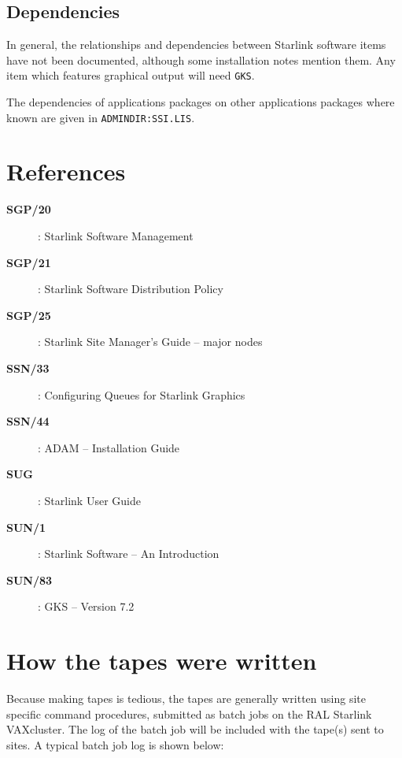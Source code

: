 \subsection {Dependencies}

In general, the relationships and dependencies between Starlink software items
have not been documented, although some installation notes mention them.
Any item which features graphical output will need {\tt GKS}.

The dependencies of applications packages on other applications packages where
known are given in {\tt ADMINDIR\-:SSI.LIS}.

\section {References}
\label{se:references}

\begin{description}
\begin{description}
\item[\bf SGP/20]: Starlink Software Management
\item[\bf SGP/21]: Starlink Software Distribution Policy
\item[\bf SGP/25]: Starlink Site Manager's Guide -- major nodes
\item[\bf SSN/33]: Configuring Queues for Starlink Graphics
\item[\bf SSN/44]: ADAM -- Installation Guide
\item[\bf SUG]: Starlink User Guide
\item[\bf SUN/1]: Starlink Software -- An Introduction
\item[\bf SUN/83]: GKS -- Version 7.2
\end{description}
\end{description}

\newpage

\appendix
\section{How the tapes were written}
\label{se:tapes}

Because making tapes is tedious, the tapes are generally written using site
specific command procedures, submitted as batch jobs on the RAL Starlink
VAXcluster. The log of the batch job will be included with the tape(s) sent to
sites. A typical batch job log is shown below:

